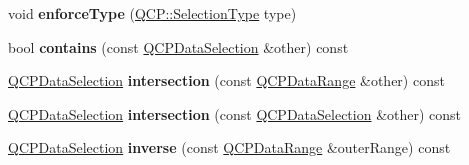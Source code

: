 \begin{DoxyCompactItemize}
\mbox{\label{class_q_c_p_data_selection_a17b84d852911531d229f4a76aa239a75}} 
void {\bfseries enforce\+Type} (\hyperlink{namespace_q_c_p_ac6cb9db26a564b27feda362a438db038}{Q\+C\+P\+::\+Selection\+Type} type)
\item 
\mbox{\label{class_q_c_p_data_selection_ab1ad3d5bbb55749c3f7ab1e45429c932}} 
bool {\bfseries contains} (const \hyperlink{class_q_c_p_data_selection}{Q\+C\+P\+Data\+Selection} \&other) const
\item 
\mbox{\label{class_q_c_p_data_selection_af5267ced53687561367105ee77b874ab}} 
\hyperlink{class_q_c_p_data_selection}{Q\+C\+P\+Data\+Selection} {\bfseries intersection} (const \hyperlink{class_q_c_p_data_range}{Q\+C\+P\+Data\+Range} \&other) const
\item 
\mbox{\label{class_q_c_p_data_selection_af296ec5a948656c1d1ecb7b2970d2a24}} 
\hyperlink{class_q_c_p_data_selection}{Q\+C\+P\+Data\+Selection} {\bfseries intersection} (const \hyperlink{class_q_c_p_data_selection}{Q\+C\+P\+Data\+Selection} \&other) const
\item 
\mbox{\label{class_q_c_p_data_selection_ae8097f4e4ffee7b1b5df27c93eb365db}} 
\hyperlink{class_q_c_p_data_selection}{Q\+C\+P\+Data\+Selection} {\bfseries inverse} (const \hyperlink{class_q_c_p_data_range}{Q\+C\+P\+Data\+Range} \&outer\+Range) const
\end{DoxyCompactItemize}

